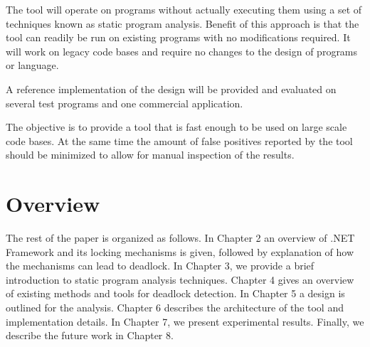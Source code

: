 The tool will operate on programs without actually executing them using a set of techniques known as static program analysis. Benefit of this approach is that the tool can readily be run on existing programs with no modifications required. It will work on legacy code bases and require no changes to the design of  programs or language.

A reference implementation of the design will be provided and evaluated on several test programs and one commercial application.

The objective is to provide a tool that is fast enough to be used on large scale code bases. At the same time the amount of false positives reported by the tool should be minimized to allow for manual inspection of the results.  

\section{Overview}

The rest of the paper is organized as follows. In Chapter 2 an overview of .NET Framework and its locking mechanisms is given, followed by explanation of how the mechanisms can lead to deadlock. In Chapter 3, we provide a brief introduction to static program analysis techniques. Chapter 4 gives an overview of existing methods and tools for deadlock detection. In Chapter 5 a design is outlined for the analysis. Chapter 6 describes the architecture of the tool and implementation details. In Chapter 7, we present experimental results. Finally, we describe the future work in Chapter 8.
